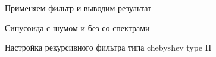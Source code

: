 \documentclass[12pt,a4paper]{scrartcl}
\begin{document}
\begin{figure}[h!]
\caption{Применяем фильтр и выводим результат}
\end{figure}
\newpage

\begin{figure}[h!]
\caption{Синусоида с шумом и без со спектрами}
\end{figure}
\newpage

\begin{figure}[h!]
\caption{Настройка рекурсивного фильтра типа chebyshev type II}
\end{figure}
\newpage
\end{document}
